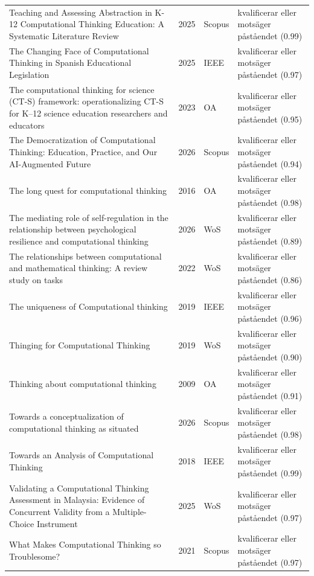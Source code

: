 \begin{longtable}{@{}%
  >{\raggedright\arraybackslash}p{}c%
  >{\raggedright\arraybackslash}p{}%
  >{\raggedright\arraybackslash}p{}@{}}
Teaching and Assessing Abstraction in K-12 Computational Thinking Education: A Systematic Literature Review & 2025 & Scopus & kvalificerar eller motsäger påståendet (0.99) \\
The Changing Face of Computational Thinking in Spanish Educational Legislation & 2025 & IEEE & kvalificerar eller motsäger påståendet (0.97) \\
The computational thinking for science (CT-S) framework: operationalizing CT-S for K--12 science education researchers and educators & 2023 & OA & kvalificerar eller motsäger påståendet (0.95) \\
The Democratization of Computational Thinking: Education, Practice, and Our AI-Augmented Future & 2026 & Scopus & kvalificerar eller motsäger påståendet (0.94) \\
The long quest for computational thinking & 2016 & OA & kvalificerar eller motsäger påståendet (0.98) \\
The mediating role of self-regulation in the relationship between psychological resilience and computational thinking & 2026 & WoS & kvalificerar eller motsäger påståendet (0.89) \\
The relationships between computational and mathematical thinking: A review study on tasks & 2022 & WoS & kvalificerar eller motsäger påståendet (0.86) \\
The uniqueness of Computational thinking & 2019 & IEEE & kvalificerar eller motsäger påståendet (0.96) \\
Thinging for Computational Thinking & 2019 & WoS & kvalificerar eller motsäger påståendet (0.90) \\
Thinking about computational thinking & 2009 & OA & kvalificerar eller motsäger påståendet (0.91) \\
Towards a conceptualization of computational thinking as situated & 2026 & Scopus & kvalificerar eller motsäger påståendet (0.98) \\
Towards an Analysis of Computational Thinking & 2018 & IEEE & kvalificerar eller motsäger påståendet (0.99) \\
Validating a Computational Thinking Assessment in Malaysia: Evidence of Concurrent Validity from a Multiple-Choice Instrument & 2025 & WoS & kvalificerar eller motsäger påståendet (0.97) \\
What Makes Computational Thinking so Troublesome? & 2021 & Scopus & kvalificerar eller motsäger påståendet (0.97) \\
\end{longtable}
\endgroup
